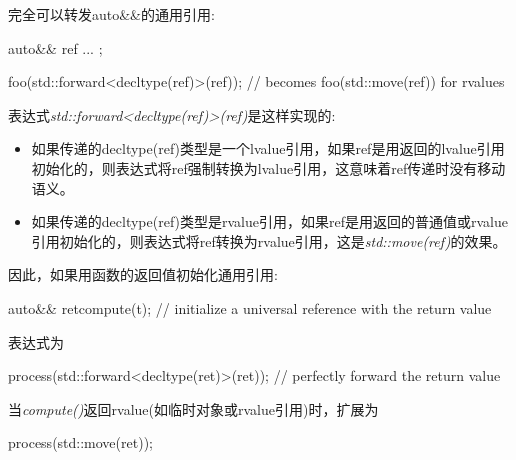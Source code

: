 完全可以转发auto\&\&的通用引用:

\begin{cppcode}
auto&& ref{ ... };

foo(std::forward<decltype(ref)>(ref)); // becomes foo(std::move(ref)) for rvalues
\end{cppcode}

表达式\textit{std::forward<decltype(ref)>(ref)}是这样实现的:

\begin{itemize}
	\item 如果传递的decltype(ref)类型是一个lvalue引用，如果ref是用返回的lvalue引用初始化的，则表达式将ref强制转换为lvalue引用，这意味着ref传递时没有移动语义。
	\item 如果传递的decltype(ref)类型是rvalue引用，如果ref是用返回的普通值或rvalue引用初始化的，则表达式将ref转换为rvalue引用，这是\textit{std::move(ref)}的效果。
\end{itemize}

因此，如果用函数的返回值初始化通用引用:

\begin{cppcode}
auto&& ret{compute(t)}; // initialize a universal reference with the return value
\end{cppcode}

表达式为

\begin{cppcode}
process(std::forward<decltype(ret)>(ret)); // perfectly forward the return value
\end{cppcode}

当\textit{compute()}返回rvalue(如临时对象或rvalue引用)时，扩展为

\begin{cppcode}
process(std::move(ret));
\end{cppcode}
























